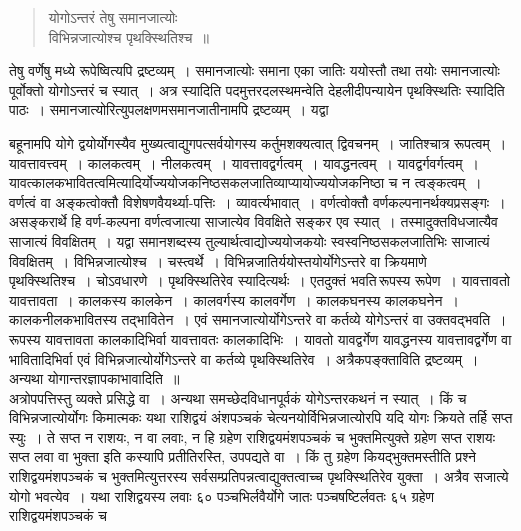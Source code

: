 \documentclass[11pt, openany]{book}
\begin{document}
 \label{7.1}
\begin{quote}
    \bs
     योगोऽन्तरं तेषु समानजात्योः \\

\vspace{-7mm}
\hspace{1cm} विभिन्नजात्योश्च पृथक्स्थितिश्च~॥
\end{quote}

 तेषु वर्णेषु मध्ये रूपेष्वित्यपि द्रष्टव्यम्~। समानजात्योः समाना 
एका जातिः ययोस्तौ तथा तयोः समानजात्योः पूर्वोक्तो योगोऽन्तरं च 
स्यात्~। अत्र स्यादिति पदमुत्तरदलस्थमन्वेति देहलीदीपन्यायेन पृथक्स्थितिः
स्यादिति पाठः~। समानजात्योरित्युपलक्षणमसमानजातीनामपि द्रष्टव्यम्~। यद्वा
\afterpage{\fancyhead[RO,LE]{\textbf{\thepage}}}
\cfoot{}
\newpage

\noindent बहूनामपि योगे द्वयोर्योगस्यैव मुख्यत्वाद्युगपत्सर्वयोगस्य
कर्तुमशक्यत्वात् द्विवचनम्~। जातिश्चात्र रूपत्वम्~। यावत्तावत्त्वम्~। कालकत्वम्~। नीलकत्वम्~। यावत्तावद्वर्गत्वम्~। यावद्धनत्वम्~। यावद्वर्गवर्गत्वम्~।
यावत्कालकभावितत्वमित्यादिर्योज्ययोजकनिष्ठसकलजातिव्याप्यायोज्ययोजकनिष्ठा च न त्वङ्कत्वम्~। वर्णत्वं वा अङ्कत्वोक्तौ विशेषणवैयर्थ्या-पत्तिः~। व्यावर्त्यभावात्~। वर्णत्वोक्तौ
वर्णकल्पनानर्थक्यप्रसङ्गः~। असङ्करार्थे हि वर्ण-कल्पना वर्णत्वजात्या साजात्येव विवक्षिते सङ्कर एव स्यात्~। तस्मादुक्तविधजात्यैव साजात्यं विवक्षितम्~। यद्वा समानशब्दस्य तुल्यार्थत्वाद्योज्ययोजकयोः स्वस्वनिष्ठसकलजातिभिः साजात्यं विवक्षितम्~। विभिन्नजात्योश्च~। चस्त्वर्थे~। विभिन्नजातिर्ययोस्तयोर्योगेऽन्तरे वा
क्रियमाणे पृथक्स्थितिश्च~। चोऽवधारणे~। पृथक्स्थितिरेव स्यादित्यर्थः~। एतदुक्तं 
भवति\textendash \,रूपस्य रूपेण~। यावत्तावतो यावत्तावता~। कालकस्य कालकेन~। कालवर्गस्य कालवर्गेण~। कालकघनस्य कालकघनेन~। कालकनीलकभावितस्य तद्भावितेन~। एवं समानजात्योर्योगेऽन्तरे वा कर्तव्ये योगेऽन्तरं
वा उक्तवद्भवति~। रूपस्य यावत्तावता कालकादिभिर्वा यावत्तावतः 
कालकादिभिः~। यावतो यावद्वर्गेण यावद्धनस्य यावत्तावद्वर्गेण वा भावितादिभिर्वा एवं विभिन्नजात्योर्योगेऽन्तरे वा कर्तव्ये पृथक्स्थितिरेव~।
अत्रैकपङ्क्ताविति द्रष्टव्यम्~। अन्यथा योगान्तरज्ञापकाभावादिति~॥\\

\vspace{-3mm}
 अत्रोपपत्तिस्तु व्यक्ते प्रसिद्धे वा~। अन्यथा समच्छेदविधानपूर्वकं 
योगेऽन्तरकथनं न स्यात्~। किं च विभिन्नजात्योर्योगः किमात्मकः यथा 
राशिद्वयं अंशपञ्चकं चेत्यनयोर्विभिन्नजात्योरपि यदि योगः क्रियते तर्हि
सप्त स्युः~। ते सप्त न राशयः, न वा लवाः, न हि ग्रहेण राशिद्वयमंशपञ्चकं च 
भुक्तमित्युक्ते ग्रहेण सप्त राशयः सप्त लवा वा भुक्ता इति कस्यापि 
प्रतीतिरस्ति, उपपद्यते वा~। किं तु ग्रहेण कियद्भुक्तमस्तीति प्रश्ने 
राशिद्वयमंशपञ्चकं च भुक्तमित्युत्तरस्य सर्वसम्प्रतिपन्नत्वाद्युक्तत्वाच्च
पृथक्स्थितिरेव युक्ता~। अत्रैव सजात्ये योगो भवत्येव~। यथा राशिद्वयस्य लवाः ६० 
पञ्चभिर्लवैर्योगे जातः पञ्चषष्टिर्लवतः ६५ ग्रहेण राशिद्वयमंशपञ्चकं च
\newpage
\end{document}
